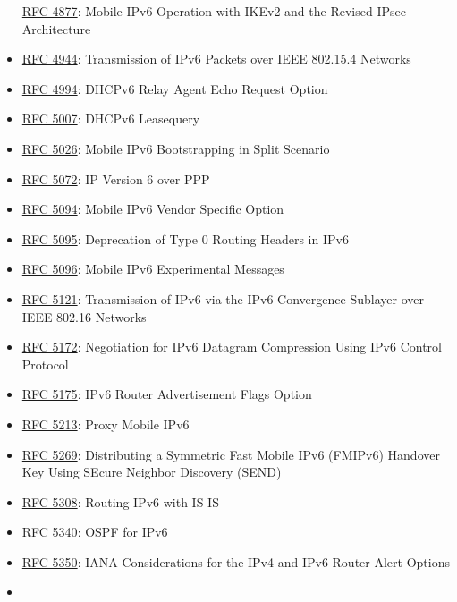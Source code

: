 \documentclass[
]{article}
\begin{document}
\begin{itemize}
  \href{https://www.rfc-editor.org/info/rfc4877}{RFC 4877}: Mobile IPv6
  Operation with IKEv2 and the Revised IPsec Architecture
\item
  \href{https://www.rfc-editor.org/info/rfc4944}{RFC 4944}: Transmission
  of IPv6 Packets over IEEE 802.15.4 Networks
\item
  \href{https://www.rfc-editor.org/info/rfc4994}{RFC 4994}: DHCPv6 Relay
  Agent Echo Request Option
\item
  \href{https://www.rfc-editor.org/info/rfc5007}{RFC 5007}: DHCPv6
  Leasequery
\item
  \href{https://www.rfc-editor.org/info/rfc5026}{RFC 5026}: Mobile IPv6
  Bootstrapping in Split Scenario
\item
  \href{https://www.rfc-editor.org/info/rfc5072}{RFC 5072}: IP Version 6
  over PPP
\item
  \href{https://www.rfc-editor.org/info/rfc5094}{RFC 5094}: Mobile IPv6
  Vendor Specific Option
\item
  \href{https://www.rfc-editor.org/info/rfc5095}{RFC 5095}: Deprecation
  of Type 0 Routing Headers in IPv6
\item
  \href{https://www.rfc-editor.org/info/rfc5096}{RFC 5096}: Mobile IPv6
  Experimental Messages
\item
  \href{https://www.rfc-editor.org/info/rfc5121}{RFC 5121}: Transmission
  of IPv6 via the IPv6 Convergence Sublayer over IEEE 802.16 Networks
\item
  \href{https://www.rfc-editor.org/info/rfc5172}{RFC 5172}: Negotiation
  for IPv6 Datagram Compression Using IPv6 Control Protocol
\item
  \href{https://www.rfc-editor.org/info/rfc5175}{RFC 5175}: IPv6 Router
  Advertisement Flags Option
\item
  \href{https://www.rfc-editor.org/info/rfc5213}{RFC 5213}: Proxy Mobile
  IPv6
\item
  \href{https://www.rfc-editor.org/info/rfc5269}{RFC 5269}: Distributing
  a Symmetric Fast Mobile IPv6 (FMIPv6) Handover Key Using SEcure
  Neighbor Discovery (SEND)
\item
  \href{https://www.rfc-editor.org/info/rfc5308}{RFC 5308}: Routing IPv6
  with IS-IS
\item
  \href{https://www.rfc-editor.org/info/rfc5340}{RFC 5340}: OSPF for
  IPv6
\item
  \href{https://www.rfc-editor.org/info/rfc5350}{RFC 5350}: IANA
  Considerations for the IPv4 and IPv6 Router Alert Options
\item

\end{itemize}
\end{document}
